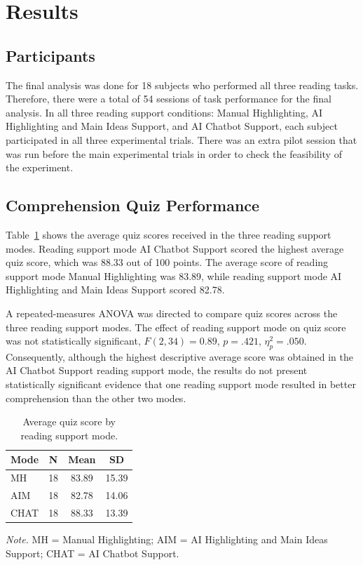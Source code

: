 \documentclass{IEEEtran}
\begin{document}
\section{Results}

\subsection{Participants}

The final analysis was done for 18 subjects who
performed all three reading tasks. Therefore, there were a total
of 54 sessions of task performance for the final analysis.
In all three reading support conditions: Manual Highlighting,
AI Highlighting and Main Ideas Support, and AI Chatbot Support,
each subject participated in all three experimental trials.
There was an extra pilot session that was run before the main
experimental trials in order to check the feasibility of the experiment.

\subsection{Comprehension Quiz Performance}

Table~\ref{tab:quiz_by_mode} shows the average quiz scores received in the three reading support modes. Reading support mode AI Chatbot
Support scored the highest average quiz score, which was 88.33
out of 100 points. The average score of reading support mode
Manual Highlighting was 83.89, while reading support mode
AI Highlighting and Main Ideas Support scored 82.78.

A repeated-measures ANOVA was directed to compare quiz scores across the three reading support modes. The effect of reading support mode on quiz
score was not statistically significant, $F(2,34)=0.89$, $p=.421$, $\eta_p^2=.050$. Consequently, although the highest descriptive average score was obtained in the AI Chatbot Support reading support mode, the results do not present statistically significant evidence that one reading support mode resulted in better comprehension than the other two modes.

\begin{table}[H]
\centering
\caption{Average quiz score by reading support mode.}
\label{tab:quiz_by_mode}
\scriptsize
\begin{tabular}{lccc}
\hline
Mode & N & Mean & SD \\
\hline
MH & 18 & 83.89 & 15.39 \\
AIM & 18 & 82.78 & 14.06 \\
CHAT & 18 & 88.33 & 13.39 \\
\hline
\end{tabular}

\vspace{1mm}
\begin{minipage}{0.95\columnwidth}
\scriptsize
\textit{Note.} MH = Manual Highlighting; AIM = AI Highlighting and Main Ideas Support; CHAT = AI Chatbot Support.
\end{minipage}
\end{table}
\end{document}

